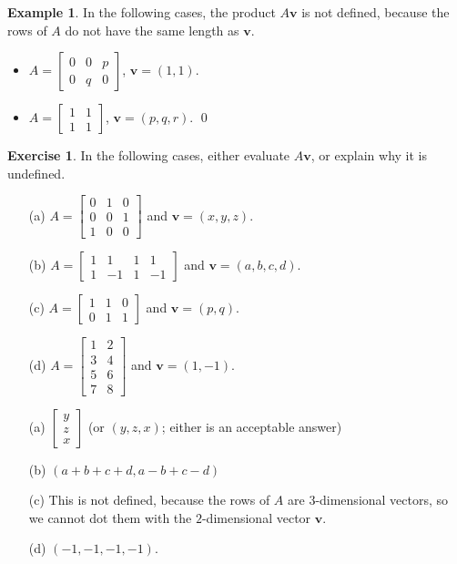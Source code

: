 \documentclass[a4paper]{book}
\newcommand{\bbm}       {\begin{bmatrix}}
\newcommand{\ebm}       {\end{bmatrix}}
\newcommand{\VEC}[1]    {\mathbf{#1}}
\renewcommand{\:}{\colon}
\theoremstyle{definition}
\newtheorem{example}[theorem]{Example}
\newtheorem{exercise}[theorem]{Exercise}
\renewenvironment{solution}{\SolutionInline}{\endSolutionInline}
\begin{document}
\begin{example}
 In the following cases, the product $A\VEC{v}$ is not defined,
 because the rows of $A$ do not have the same length as $\VEC{v}$.
 \begin{itemize}
  \item $A=\bbm 0&0&p \\ 0&q&0 \ebm$,
    $\VEC{v}=(1,1)$.
  \item $A=\bbm 1&1 \\ 1&1 \ebm$,
    $\VEC{v}=(p,q,r)$. \qed
 \end{itemize}
\end{example}
\begin{exercise}
 In the following cases, either evaluate $A\VEC{v}$, or explain why it
 is undefined.
 \begin{itemize}
  \item[(a)] 
   $A = \begin{bmatrix} 0&1&0 \\ 0&0&1 \\ 1&0&0 \end{bmatrix}$ and 
   $\VEC{v}=(x,y,z)$.
  \item[(b)] 
   $A = \begin{bmatrix} 1&1&1&1 \\ 1&-1&1&-1 \end{bmatrix}$ and 
   $\VEC{v}=(a,b,c,d)$.
  \item[(c)] 
   $A = \begin{bmatrix} 1&1&0 \\ 0&1&1 \end{bmatrix}$ and 
   $\VEC{v}=(p,q)$.
  \item[(d)] 
   $A = \begin{bmatrix} 1&2 \\ 3&4 \\ 5&6 \\ 7&8 \end{bmatrix}$ and 
   $\VEC{v}=(1,-1)$.
 \end{itemize}
\end{exercise}
\begin{solution}
 \begin{itemize}
  \item[(a)] $\bbm y\\ z\\ x\ebm$ (or $(y,z,x)$; 
   either is an acceptable answer)
  \item[(b)] $(a+b+c+d,a-b+c-d)$
  \item[(c)] This is not defined, because the rows of $A$ are
   $3$-dimensional vectors, so we cannot dot them with the
   $2$-dimensional vector $\VEC{v}$.
  \item[(d)] $(-1,-1,-1,-1)$.
 \end{itemize}
\end{solution}
\end{document}
